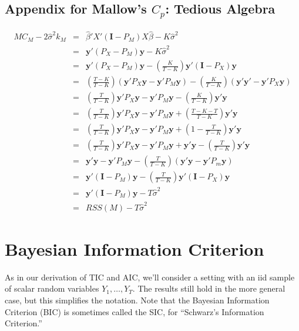 \subsection{Appendix for Mallow's $C_p$: Tedious Algebra} 
\begin{eqnarray*}
	MC_M - 2\widehat{\sigma}^2k_M &=& \widehat{\beta}'X'(\mathbf{I} - P_M)X\widehat{\beta} - K\widehat{\sigma}^2\\
	&=& \mathbf{y}'(P_X - P_M)\mathbf{y} -  K\widehat{\sigma}^2\\
   &=& \mathbf{y}'(P_X - P_M)\mathbf{y} - \left(\frac{K}{T-K}\right)\mathbf{y}'\left(\mathbf{I} - P_X\right)\mathbf{y}\\
		&=& \left(\frac{T-K}{T-K}\right)(\mathbf{y}'P_X\mathbf{y} - \mathbf{y}'P_M\mathbf{y}) - \left(\frac{K}{T-K}\right)(\mathbf{y}'\mathbf{y}' - \mathbf{y}'P_X \mathbf{y})\\
			&=&\left(\frac{T}{T-K}\right)\mathbf{y}'P_X \mathbf{y} - \mathbf{y}'P_M\mathbf{y} - \left(\frac{K}{T-K} \right)\mathbf{y}'\mathbf{y}  \\
			&=& \left(\frac{T}{T-K}\right)\mathbf{y}'P_X \mathbf{y} - \mathbf{y}'P_M\mathbf{y} + \left(\frac{T - K - T}{T-K} \right)\mathbf{y}'\mathbf{y}  \\
			&=&  \left(\frac{T}{T-K} \right)\mathbf{y}'P_X \mathbf{y} - \mathbf{y}' P_M \mathbf{y} + \left(1 - \frac{T}{T-K}\right)\mathbf{y}'\mathbf{y} \\
			&=&  \left(\frac{T}{T-K} \right)\mathbf{y}'P_X \mathbf{y} - \mathbf{y}' P_M \mathbf{y} + \mathbf{y}'\mathbf{y} - \left(\frac{T}{T-K}\right)\mathbf{y}'\mathbf{y}  \\
			&=& \mathbf{y}'\mathbf{y} - \mathbf{y}'P_M\mathbf{y} - \left(\frac{T}{T-K} \right)(\mathbf{y}'\mathbf{y} - \mathbf{y}'P_m\mathbf{y})\\
			&=& \mathbf{y}'(\mathbf{I} - P_M)\mathbf{y} - \left(\frac{T}{T-K}\right)\mathbf{y}'\left(\mathbf{I} - P_X\right)\mathbf{y}\\
			&=& \mathbf{y}'(\mathbf{I} - P_M)\mathbf{y} - T\widehat{\sigma}^2\\
			&=& RSS(M) - T\widehat{\sigma}^2
      \end{eqnarray*}

\section{Bayesian Information Criterion}
As in our derivation of TIC and AIC, we'll consider a setting with an iid sample of scalar random variables $Y_1, \hdots, Y_T$. 
The results still hold in the more general case, but this simplifies the notation. 
Note that the Bayesian Information Criterion (BIC) is sometimes called the SIC, for ``Schwarz's Information Criterion.''

